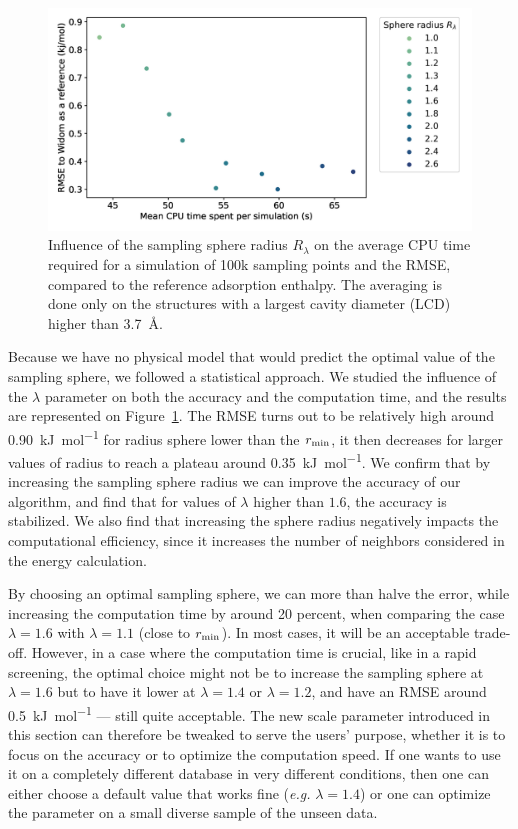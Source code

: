 \documentclass[main]{subfiles}
\begin{document}
\begin{figure}[ht]
\centering
  \includegraphics[width=0.7\linewidth]{figures/3-fastsim/sphere_size_optimisation.png}
  \caption{Influence of the sampling sphere radius $R_{\lambda}$ on the average CPU time required for a simulation of 100k sampling points and the RMSE, compared to the reference adsorption enthalpy. The averaging is done only on the structures with a largest cavity diameter (LCD) higher than \SI{3.7}{\angstrom}.}\label{fgr:radius}
\end{figure}

Because we have no physical model that would predict the optimal value of the sampling sphere, we followed a statistical approach. We studied the influence of the $\lambda$ parameter on both the accuracy and the computation time, and the results are represented on Figure~\ref{fgr:radius}. The RMSE turns out to be relatively high around \SI{0.90}{\kilo\joule\per\mole} for radius sphere lower than the $r_{\text{min}}$, it then decreases for larger values of radius to reach a plateau around \SI{0.35}{\kilo\joule\per\mole}. We confirm that by increasing the sampling sphere radius we can improve the accuracy of our algorithm, and find that for values of $\lambda$ higher than $1.6$, the accuracy is stabilized. We also find that increasing the sphere radius negatively impacts the computational efficiency, since it increases the number of neighbors considered in the energy calculation.

By choosing an optimal sampling sphere, we can more than halve the error, while increasing the computation time by around 20 percent, when comparing the case $\lambda=1.6$ with $\lambda=1.1$ (close to $r_{\text{min}}$). In most cases, it will be an acceptable trade-off. However, in a case where the computation time is crucial, like in a rapid screening, the optimal choice might not be to increase the sampling sphere at $\lambda=1.6$ but to have it lower at $\lambda=1.4$ or $\lambda=1.2$, and have an RMSE around \SI{0.5}{\kilo\joule\per\mole} --- still quite acceptable. The new scale parameter introduced in this section can therefore be tweaked to serve the users' purpose, whether it is to focus on the accuracy or to optimize the computation speed. {If one wants to use it on a completely different database in very different conditions, then one can either choose a default value that works fine (\emph{e.g.} $\lambda=1.4$) or one can optimize the parameter on a small diverse sample of the unseen data. }
\end{document}
